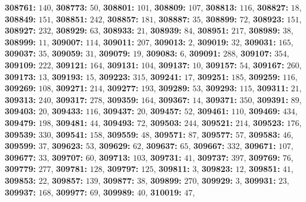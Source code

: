 \textsf{\bfseries 308761:} $140$, \textsf{\bfseries 308773:} $50$, \textsf{\bfseries 308801:} $101$, \textsf{\bfseries 308809:} $107$, \textsf{\bfseries 308813:} $116$, \textsf{\bfseries 308827:} $18$, \textsf{\bfseries 308849:} $151$, \textsf{\bfseries 308851:} $242$, \textsf{\bfseries 308857:} $181$, \textsf{\bfseries 308887:} $35$, \textsf{\bfseries 308899:} $72$, \textsf{\bfseries 308923:} $151$, \textsf{\bfseries 308927:} $232$, \textsf{\bfseries 308929:} $63$, \textsf{\bfseries 308933:} $21$, \textsf{\bfseries 308939:} $84$, \textsf{\bfseries 308951:} $217$, \textsf{\bfseries 308989:} $38$, \textsf{\bfseries 308999:} $11$, \textsf{\bfseries 309007:} $114$, \textsf{\bfseries 309011:} $207$, \textsf{\bfseries 309013:} $2$, \textsf{\bfseries 309019:} $32$, \textsf{\bfseries 309031:} $165$, \textsf{\bfseries 309037:} $35$, \textsf{\bfseries 309059:} $31$, \textsf{\bfseries 309079:} $19$, \textsf{\bfseries 309083:} $6$, \textsf{\bfseries 309091:} $288$, \textsf{\bfseries 309107:} $354$, \textsf{\bfseries 309109:} $222$, \textsf{\bfseries 309121:} $164$, \textsf{\bfseries 309131:} $104$, \textsf{\bfseries 309137:} $10$, \textsf{\bfseries 309157:} $54$, \textsf{\bfseries 309167:} $260$, \textsf{\bfseries 309173:} $13$, \textsf{\bfseries 309193:} $15$, \textsf{\bfseries 309223:} $315$, \textsf{\bfseries 309241:} $17$, \textsf{\bfseries 309251:} $185$, \textsf{\bfseries 309259:} $116$, \textsf{\bfseries 309269:} $108$, \textsf{\bfseries 309271:} $214$, \textsf{\bfseries 309277:} $193$, \textsf{\bfseries 309289:} $53$, \textsf{\bfseries 309293:} $115$, \textsf{\bfseries 309311:} $21$, \textsf{\bfseries 309313:} $240$, \textsf{\bfseries 309317:} $278$, \textsf{\bfseries 309359:} $164$, \textsf{\bfseries 309367:} $14$, \textsf{\bfseries 309371:} $350$, \textsf{\bfseries 309391:} $89$, \textsf{\bfseries 309403:} $20$, \textsf{\bfseries 309433:} $116$, \textsf{\bfseries 309437:} $20$, \textsf{\bfseries 309457:} $52$, \textsf{\bfseries 309461:} $110$, \textsf{\bfseries 309469:} $434$, \textsf{\bfseries 309479:} $198$, \textsf{\bfseries 309481:} $44$, \textsf{\bfseries 309493:} $72$, \textsf{\bfseries 309503:} $244$, \textsf{\bfseries 309521:} $214$, \textsf{\bfseries 309523:} $176$, \textsf{\bfseries 309539:} $330$, \textsf{\bfseries 309541:} $158$, \textsf{\bfseries 309559:} $48$, \textsf{\bfseries 309571:} $87$, \textsf{\bfseries 309577:} $57$, \textsf{\bfseries 309583:} $46$, \textsf{\bfseries 309599:} $37$, \textsf{\bfseries 309623:} $53$, \textsf{\bfseries 309629:} $62$, \textsf{\bfseries 309637:} $65$, \textsf{\bfseries 309667:} $332$, \textsf{\bfseries 309671:} $107$, \textsf{\bfseries 309677:} $33$, \textsf{\bfseries 309707:} $60$, \textsf{\bfseries 309713:} $103$, \textsf{\bfseries 309731:} $41$, \textsf{\bfseries 309737:} $397$, \textsf{\bfseries 309769:} $76$, \textsf{\bfseries 309779:} $277$, \textsf{\bfseries 309781:} $128$, \textsf{\bfseries 309797:} $125$, \textsf{\bfseries 309811:} $3$, \textsf{\bfseries 309823:} $12$, \textsf{\bfseries 309851:} $41$, \textsf{\bfseries 309853:} $22$, \textsf{\bfseries 309857:} $139$, \textsf{\bfseries 309877:} $38$, \textsf{\bfseries 309899:} $270$, \textsf{\bfseries 309929:} $3$, \textsf{\bfseries 309931:} $23$, \textsf{\bfseries 309937:} $168$, \textsf{\bfseries 309977:} $69$, \textsf{\bfseries 309989:} $40$, \textsf{\bfseries 310019:} $47$, 
